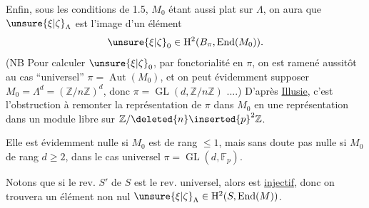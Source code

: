 Enfin, sous les conditions de 1.5, $M_0$ étant aussi plat sur $\Lambda$, on aura que $\unsure{\xi|\zeta}_\Lambda$ est l'image d'un élément
\[
\unsure{\xi|\zeta}_0\in\mathrm H^2(B_\pi,\operatorname{End}(M_0)).
\]
(NB Pour calculer $\unsure{\xi|\zeta}_0$, par fonctorialité en $\pi$, on est ramené aussitôt au cas ``universel'' $\pi=\operatorname{Aut}(M_0)$, et on peut évidemment supposer $M_0=\Lambda^d=(\mathbb Z/n\mathbb Z)^d$, donc $\pi=\operatorname{GL}(d,\mathbb Z/n\mathbb Z)$ ....) D'après \uline{Illusie}, c'est l'obstruction à remonter la représentation de $\pi$ dans $M_0$ en une représentation dans un module libre sur $\mathbb Z/\deleted{n}\inserted{p}^2\mathbb Z$.

 Elle est évidemment nulle si $M_0$ est de rang $\leq1$, mais sans doute pas nulle si $M_0$ de rang $d\geq2$, dans le cas universel $\pi=\operatorname{GL}(d,\mathbb F_p)$.

Notons que si le rev. $S'$ de $S$ est le rev. universel, alors
est \uline{injectif}, donc on trouvera un élément non nul  $\unsure{\xi|\zeta}_\Lambda\in\mathrm H^2(S,\operatorname{End}(M))$.
